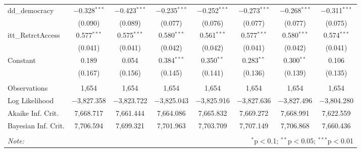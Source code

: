 \begin{sidewaystable}[!htbp]
\begin{tabular}{@{\extracolsep{5pt}}lccccccc}
  dd\_democracy & $-$0.328$^{***}$ & $-$0.423$^{***}$ & $-$0.235$^{***}$ & $-$0.252$^{***}$ & $-$0.273$^{***}$ & $-$0.268$^{***}$ & $-$0.311$^{***}$ \\ 
  & (0.090) & (0.089) & (0.077) & (0.076) & (0.077) & (0.077) & (0.075) \\ 
  itt\_RstrctAccess & 0.577$^{***}$ & 0.575$^{***}$ & 0.580$^{***}$ & 0.561$^{***}$ & 0.577$^{***}$ & 0.580$^{***}$ & 0.574$^{***}$ \\ 
  & (0.041) & (0.041) & (0.042) & (0.042) & (0.041) & (0.042) & (0.041) \\ 
  Constant & 0.189 & 0.054 & 0.384$^{***}$ & 0.350$^{**}$ & 0.283$^{**}$ & 0.300$^{**}$ & 0.106 \\ 
  & (0.167) & (0.156) & (0.145) & (0.141) & (0.136) & (0.139) & (0.135) \\ 
 \hline \\[-1.8ex] 
Observations & 1,654 & 1,654 & 1,654 & 1,654 & 1,654 & 1,654 & 1,654 \\ 
Log Likelihood & $-$3,827.358 & $-$3,823.722 & $-$3,825.043 & $-$3,825.916 & $-$3,827.636 & $-$3,827.496 & $-$3,804.280 \\ 
Akaike Inf. Crit. & 7,668.717 & 7,661.444 & 7,664.086 & 7,665.832 & 7,669.272 & 7,668.991 & 7,622.559 \\ 
Bayesian Inf. Crit. & 7,706.594 & 7,699.321 & 7,701.963 & 7,703.709 & 7,707.149 & 7,706.868 & 7,660.436 \\ 
\hline 
\hline \\[-1.8ex] 
\textit{Note:}  & \multicolumn{7}{r}{$^{*}$p$<$0.1; $^{**}$p$<$0.05; $^{***}$p$<$0.01} \\ 
\end{tabular} 
\end{sidewaystable} 
